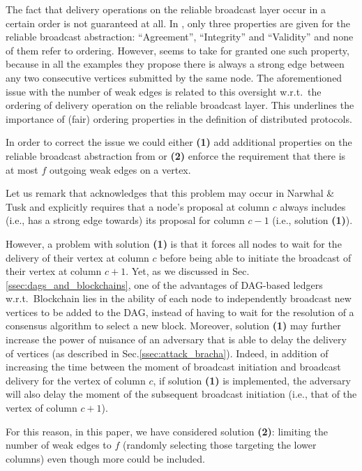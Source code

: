 The fact that delivery operations on the reliable broadcast layer occur in a certain order is not guaranteed at all. In \cite{all_you_need_is_dag}, only three properties are given for the reliable broadcast abstraction: ``Agreement'', ``Integrity'' and ``Validity'' and none of them refer to ordering.
However, \cite{all_you_need_is_dag} seems to take for granted one such property, because in all the examples they propose there is always a strong edge between any two consecutive vertices submitted by the same node.
The aforementioned issue with the number of weak edges is related to this oversight w.r.t.~the ordering of delivery operation on the reliable broadcast layer. This underlines the importance of (fair) ordering properties in the definition of distributed protocols.

In order to correct the issue we could either \textbf{(1)} add additional properties on the reliable broadcast abstraction from \cite{all_you_need_is_dag} or \textbf{(2)} enforce the requirement that there is at most $f$ outgoing weak edges on a vertex.

Let us remark that \cite{reducing_latency_of_dag_based_consensus_in_the_asynchronous_setting_via_the_utxo_model} acknowledges that this problem may occur in Narwhal \& Tusk \cite{narwhal_and_tusk} and explicitly requires that a node's proposal at column $c$ always includes (i.e., has a strong edge towards) its proposal for column $c-1$ (i.e., solution \textbf{(1)}).

However, a problem with solution \textbf{(1)} is that it forces all nodes to wait for the delivery of their vertex at column $c$ before being able to initiate the broadcast of their vertex at column $c+1$.
Yet, as we discussed in Sec.\ref{ssec:dags_and_blockchains}, one of the advantages of DAG-based ledgers w.r.t.~Blockchain lies in the ability of each node to independently broadcast new vertices to be added to the DAG, instead of having to wait for the resolution of a consensus algorithm to select a new block.
Moreover, solution \textbf{(1)} may further increase the power of nuisance of an adversary that is able to delay the delivery of vertices (as described in Sec.\ref{ssec:attack_bracha}). Indeed, in addition of increasing the time between the moment of broadcast initiation and broadcast delivery for the vertex of column $c$, if solution \textbf{(1)} is implemented, the adversary will also delay the moment of the subsequent broadcast initiation (i.e., that of the vertex of column $c+1$).

For this reason, in this paper, we have considered solution \textbf{(2)}: limiting the number of weak edges to $f$ (randomly selecting those targeting the lower columns) even though more could be included.

